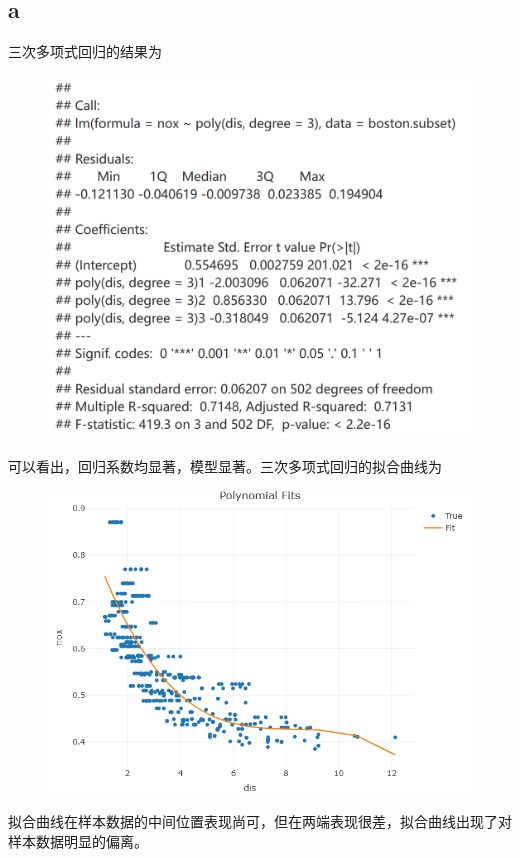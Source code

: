 \documentclass[12pt,a4paper]{article}
\begin{document}
    \title{}
    \date{}
    \author{姓名：\underline{刘哲}~~~~~~学号：\underline{2022103691}~~~~~~}
    \maketitle
    \section{}
    \vspace{10pt}
    \subsection*{a}
    三次多项式回归的结果为
    \begin{figure}[H]
        \centering
        \includegraphics[scale=0.3]{CubicReg.png}
    \end{figure}
    可以看出，回归系数均显著，模型显著。三次多项式回归的拟合曲线为
    \begin{figure}[H]
        \centering
        \includegraphics[scale=0.6]{CubicFit.png}
    \end{figure}
    拟合曲线在样本数据的中间位置表现尚可，但在两端表现很差，拟合曲线出现了对样本数据明显的偏离。
\end{document}
